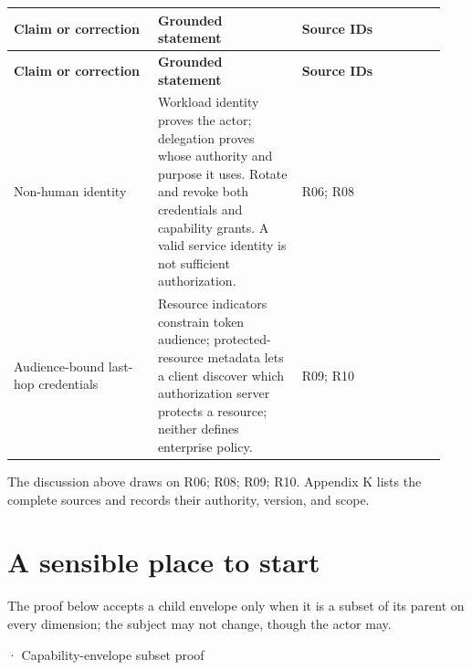 \BookTableStart
\small
\begin{longtable}{@{}Y{0.3133\linewidth}Y{0.3133\linewidth}Y{0.3133\linewidth}@{}}
\color{white}\bfseries \textbf{Claim or correction} & \color{white}\bfseries \textbf{Grounded statement} & \color{white}\bfseries \textbf{Source IDs} \\
\endfirsthead
{}
\color{white}\bfseries \textbf{Claim or correction} & \color{white}\bfseries \textbf{Grounded statement} & \color{white}\bfseries \textbf{Source IDs} \\
\endhead
Non-human identity & Workload identity proves the actor; delegation proves whose authority and purpose it uses. Rotate and revoke both credentials and capability grants. A valid service identity is not sufficient authorization. & R06; R08 \\
Audience-bound last-hop credentials & Resource indicators constrain token audience; protected-resource metadata lets a client discover which authorization server protects a resource; neither defines enterprise policy. & R09; R10 \\
\end{longtable}
\BookTableEnd

The discussion above draws on R06; R08; R09; R10. Appendix K lists the complete sources and records their authority, version, and scope.\par

\section{A sensible place to start}

The proof below accepts a child envelope only when it is a subset of its parent on every dimension; the subject may not change, though the actor may.\par

\BookSnake · Capability-envelope subset proof\par

